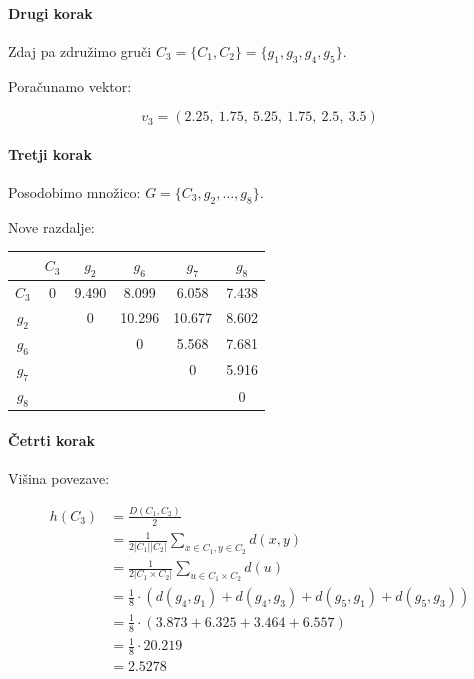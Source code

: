 \documentclass{article}
\begin{document}
\begin{enumerate}
		\paragraph{Drugi korak} Zdaj pa združimo gruči $C_3 = \{ C_1, C_2 \} = \{ g_1, g_3, g_4, g_5 \}$.

		Poračunamo vektor:

		$$
		v_3 = (2.25, \ 1.75, \ 5.25, \ 1.75, \ 2.5, \ 3.5)
		$$

		\paragraph{Tretji korak} Posodobimo množico: $G = \{ C_3, g_2, \dots, g_8 \}$.

		Nove razdalje:

		\begin{center}
			\begin{tabular}{c||c|c|c|c|c|}
				& $C_3$ & $g_2$ & $g_6$ & $g_7$ & $g_8$ \\
				\hline
				\hline
				$C_3$ & 0     & 9.490 & 8.099 & 6.058 & 7.438 \\
				\hline
				$g_2$ &       & 0     & 10.296 & 10.677 & 8.602 \\
				\hline
				$g_6$ &       &       & 0     & 5.568 & 7.681 \\
				\hline
				$g_7$ &       &       &       & 0     & 5.916 \\
				\hline
				$g_8$ &       &       &       &       & 0     \\
			\end{tabular}
		\end{center}

		\paragraph{Četrti korak} Višina povezave:

		\begin{align*}
			h(C_3) &= \frac{ D(C_1, C_2) }{ 2 } \\
				   &= \frac{ 1 }{ 2 |C_1| |C_2| } \sum_{x\in C_1, y\in C_2} d(x,y) \\
				   &= \frac{ 1 }{ 2 |C_1 \times C_2| } \sum_{u \in C_1 \times C_2} d(u) \\
				   &= \frac{ 1 }{ 8 } \cdot \left( d(g_4, g_1) + d(g_4, g_3) + d(g_5, g_1) + d(g_5, g_3) \right) \\
				   &= \frac{1}{8} \cdot \left( 3.873 + 6.325 + 3.464 + 6.557 \right) \\
				   &= \frac{1}{8} \cdot 20.219 \\
				   &= 2.5278
		\end{align*}


\end{enumerate}
\end{document}
